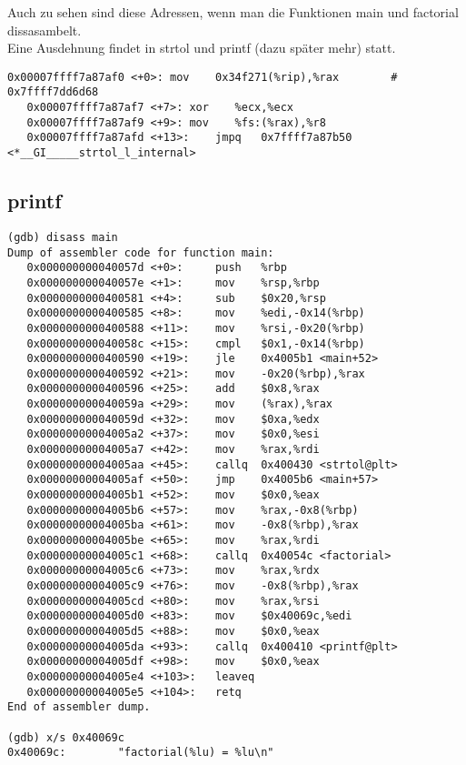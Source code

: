 Auch zu sehen sind diese Adressen, wenn man die Funktionen main und factorial dissasambelt.\\
Eine Ausdehnung findet in strtol und printf (dazu später mehr) statt.
\begin{lstlisting}[numbers=none]
   0x00007ffff7a87af0 <+0>:	mov    0x34f271(%rip),%rax        # 0x7ffff7dd6d68
   0x00007ffff7a87af7 <+7>:	xor    %ecx,%ecx
   0x00007ffff7a87af9 <+9>:	mov    %fs:(%rax),%r8
   0x00007ffff7a87afd <+13>:	jmpq   0x7ffff7a87b50 <*__GI_____strtol_l_internal>
\end{lstlisting}
\clearpage
\subsection{}

\clearpage
\subsection{printf}

\begin{lstlisting}[numbers=none]
(gdb) disass main
Dump of assembler code for function main:
   0x000000000040057d <+0>:     push   %rbp
   0x000000000040057e <+1>:     mov    %rsp,%rbp
   0x0000000000400581 <+4>:     sub    $0x20,%rsp
   0x0000000000400585 <+8>:     mov    %edi,-0x14(%rbp)
   0x0000000000400588 <+11>:    mov    %rsi,-0x20(%rbp)
   0x000000000040058c <+15>:    cmpl   $0x1,-0x14(%rbp)
   0x0000000000400590 <+19>:    jle    0x4005b1 <main+52>
   0x0000000000400592 <+21>:    mov    -0x20(%rbp),%rax
   0x0000000000400596 <+25>:    add    $0x8,%rax
   0x000000000040059a <+29>:    mov    (%rax),%rax
   0x000000000040059d <+32>:    mov    $0xa,%edx
   0x00000000004005a2 <+37>:    mov    $0x0,%esi
   0x00000000004005a7 <+42>:    mov    %rax,%rdi
   0x00000000004005aa <+45>:    callq  0x400430 <strtol@plt>
   0x00000000004005af <+50>:    jmp    0x4005b6 <main+57>
   0x00000000004005b1 <+52>:    mov    $0x0,%eax
   0x00000000004005b6 <+57>:    mov    %rax,-0x8(%rbp)
   0x00000000004005ba <+61>:    mov    -0x8(%rbp),%rax
   0x00000000004005be <+65>:    mov    %rax,%rdi
   0x00000000004005c1 <+68>:    callq  0x40054c <factorial>
   0x00000000004005c6 <+73>:    mov    %rax,%rdx
   0x00000000004005c9 <+76>:    mov    -0x8(%rbp),%rax
   0x00000000004005cd <+80>:    mov    %rax,%rsi
   0x00000000004005d0 <+83>:    mov    $0x40069c,%edi
   0x00000000004005d5 <+88>:    mov    $0x0,%eax
   0x00000000004005da <+93>:    callq  0x400410 <printf@plt>
   0x00000000004005df <+98>:    mov    $0x0,%eax
   0x00000000004005e4 <+103>:   leaveq
   0x00000000004005e5 <+104>:   retq
End of assembler dump.

(gdb) x/s 0x40069c
0x40069c:        "factorial(%lu) = %lu\n"
\end{lstlisting}


